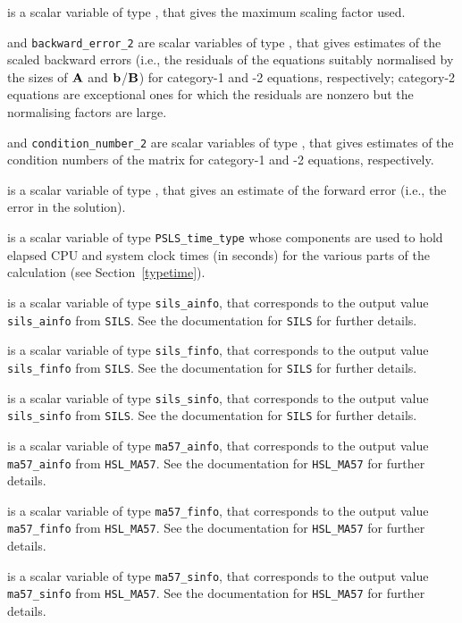 \documentclass{galahad}
\newcommand{\packagename}{PSLS}
\begin{document}
\begin{description}
 is a scalar variable of type \realdp,
that gives the maximum scaling factor used.

 and
{\tt backward\_error\_2} are scalar variables of type \realdp,
that gives estimates of the scaled backward errors (i.e., the residuals
of the equations suitably normalised by the sizes of ${\mathbf{A}}$ and 
${\mathbf{b}}$/${\mathbf{B}}$) for category-1 and -2 equations, respectively;
category-2 equations are exceptional ones for which the residuals are 
nonzero but the normalising factors are large.

 and
{\tt condition\_number\_2} are scalar variables of type \realdp,
that gives estimates of the condition numbers of the matrix
for category-1 and -2 equations, respectively.

 is a scalar variable of type \realdp,
that gives an estimate of the forward error (i.e., the error in the solution).

 is a scalar variable of type {\tt \packagename\_time\_type}
whose components are used to hold elapsed CPU and system clock times
(in seconds) for the various parts of the calculation
(see Section~\ref{typetime}).

 is a scalar variable of type {\tt sils\_ainfo},
that corresponds to the output value {\tt sils\_ainfo}
from {\tt SILS}. See the documentation for {\tt SILS} for further
details.

 is a scalar variable of type {\tt sils\_finfo},
that corresponds to the output value {\tt sils\_finfo}
from {\tt SILS}. See the documentation for {\tt SILS} for further
details.

 is a scalar variable of type {\tt sils\_sinfo},
that corresponds to the output value {\tt sils\_sinfo}
from {\tt SILS}. See the documentation for {\tt SILS} for further
details.

 is a scalar variable of type {\tt ma57\_ainfo},
that corresponds to the output value {\tt ma57\_ainfo}
from {\tt HSL\_MA57}. See the documentation for {\tt HSL\_MA57} for further
details.

 is a scalar variable of type {\tt ma57\_finfo},
that corresponds to the output value {\tt ma57\_finfo}
from {\tt HSL\_MA57}. See the documentation for {\tt HSL\_MA57} for further
details.

 is a scalar variable of type {\tt ma57\_sinfo},
that corresponds to the output value {\tt ma57\_sinfo}
from {\tt HSL\_MA57}. See the documentation for {\tt HSL\_MA57} for further
details.


\end{description}
\end{document}
